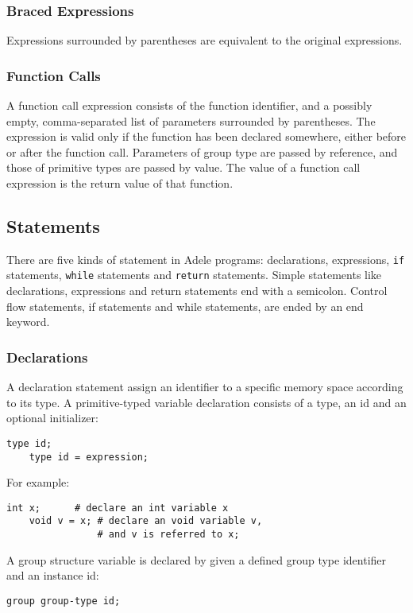 \documentclass[11pt,letterpaper]{article}
\begin{document}
\subsubsection {Braced Expressions}
Expressions surrounded by parentheses are equivalent to the original expressions.

\subsubsection {Function Calls}
A function call expression consists of the function identifier, and a possibly empty, comma-separated list of parameters surrounded by parentheses. The expression is valid only if the function has been declared somewhere, either before or after the function call. Parameters of group type are passed by reference, and those of primitive types are passed by value. The value of a function call expression is the return value of that function.

\subsection {Statements}
There are five kinds of statement in Adele programs: declarations, expressions, \texttt{if} statements, \texttt{while} statements and \texttt{return} statements. Simple statements like declarations, expressions and return statements end with a semicolon. Control flow statements, if statements and while statements, are ended by an end keyword.

\subsubsection {Declarations}
A declaration statement assign an identifier to a specific memory space according to its type. A primitive-typed variable declaration consists of a type, an id and an optional initializer:
\begin{lstlisting}[tabsize=4]
	type id;
	type id = expression;
\end{lstlisting}

For example:
\begin{lstlisting}[tabsize=4]
	int x; 		# declare an int variable x
	void v = x; # declare an void variable v, 
                # and v is referred to x;
\end{lstlisting}

A group structure variable is declared by given a defined group type identifier and an instance id:
\begin{lstlisting}[tabsize=4]
	group group-type id;
\end{lstlisting}
\end{document}
